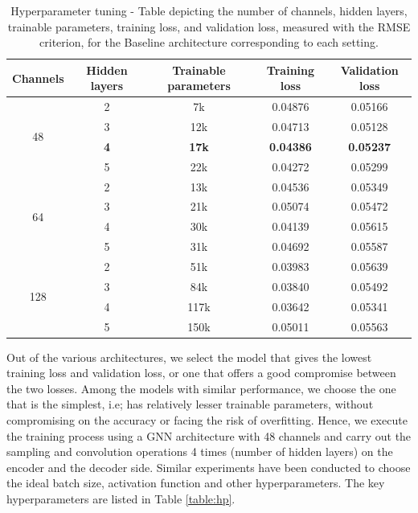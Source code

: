 \begin{table}[ht]
    \centering
    \caption{Hyperparameter tuning - Table depicting the number of channels, hidden layers, trainable parameters, training loss, and validation loss, measured with the RMSE criterion, for the Baseline architecture corresponding to each setting.}
    \label{table:complex}
    \begin{tabular}{|c|c|c|c|c|}
    \hline
    \textbf{Channels} & \textbf{Hidden layers} & \textbf{Trainable parameters} & \textbf{Training loss} & \textbf{Validation loss}\\
    \hline
    \multirow{4}{*}{48} & 2 & 7k &  0.04876&  0.05166\\
    \cline{2-5}
                        & 3 & 12k &  0.04713&  0.05128\\
    \cline{2-5}
                        & \textbf{4} & \textbf{17k} & \textbf{0.04386}&  \textbf{0.05237}\\
    \cline{2-5}
                        & 5 & 22k &  0.04272 &  0.05299\\
    \hline
    \multirow{4}{*}{64} & 2 & 13k & 0.04536&  0.05349\\
    \cline{2-5}
                        & 3 & 21k & 0.05074 &  0.05472\\
    \cline{2-5}
                        & 4 & 30k &  0.04139&  0.05615\\
    \cline{2-5}
                        & 5 & 31k & 0.04692 &  0.05587\\
    \hline
    \multirow{4}{*}{128} & 2 & 51k& 0.03983&  0.05639\\
    \cline{2-5}         
                         & 3 & 84k & 0.03840&  0.05492\\
    \cline{2-5}
                         & 4 & 117k & 0.03642 &  0.05341 \\
    \cline{2-5}
                         & 5 & 150k &  0.05011&  0.05563\\
    \hline
    \end{tabular}
    
    \end{table}
Out of the various architectures, we select the model that gives the lowest training loss and validation loss, or one that offers a good compromise between the two losses. Among the models with similar performance, we choose the one that is the simplest, i.e; has relatively lesser trainable parameters, without compromising on the accuracy or facing the risk of overfitting. Hence, we execute the training process using a GNN architecture with 48 channels and carry out the sampling and convolution operations 4 times (number of hidden layers) on the encoder and the decoder side. Similar experiments have been conducted to choose the ideal batch size, activation function and other hyperparameters. The key hyperparameters are listed in Table \ref{table:hp}. 
